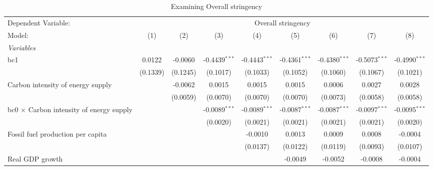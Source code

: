 
\begin{table}[htbp]
   \caption{Examining Overall stringency}
   \centering
   \begin{tabular}{lcccccccc}
      \tabularnewline \midrule \midrule
      Dependent Variable: & \multicolumn{8}{c}{Overall stringency}\\
      Model:                                          & (1)      & (2)      & (3)             & (4)             & (5)             & (6)             & (7)             & (8)\\  
      \midrule
      \emph{Variables}\\
      bc1                                             & 0.0122   & -0.0060  & -0.4439$^{***}$ & -0.4443$^{***}$ & -0.4361$^{***}$ & -0.4380$^{***}$ & -0.5073$^{***}$ & -0.4990$^{***}$\\   
                                                      & (0.1339) & (0.1245) & (0.1017)        & (0.1033)        & (0.1052)        & (0.1060)        & (0.1067)        & (0.1021)\\   
      Carbon intensity of energy supply               &          & -0.0062  & 0.0015          & 0.0015          & 0.0015          & 0.0006          & 0.0027          & 0.0028\\   
                                                      &          & (0.0059) & (0.0070)        & (0.0070)        & (0.0070)        & (0.0073)        & (0.0058)        & (0.0058)\\   
      bc0 $\times$ Carbon intensity of energy supply  &          &          & -0.0089$^{***}$ & -0.0089$^{***}$ & -0.0087$^{***}$ & -0.0087$^{***}$ & -0.0097$^{***}$ & -0.0095$^{***}$\\   
                                                      &          &          & (0.0020)        & (0.0021)        & (0.0021)        & (0.0021)        & (0.0021)        & (0.0020)\\   
      Fossil fuel production per capita               &          &          &                 & -0.0010         & 0.0013          & 0.0009          & 0.0008          & -0.0004\\   
                                                      &          &          &                 & (0.0137)        & (0.0122)        & (0.0119)        & (0.0093)        & (0.0107)\\   
      Real GDP growth                                 &          &          &                 &                 & -0.0049         & -0.0052         & -0.0008         & -0.0004\\   

\end{tabular}
\end{table}
